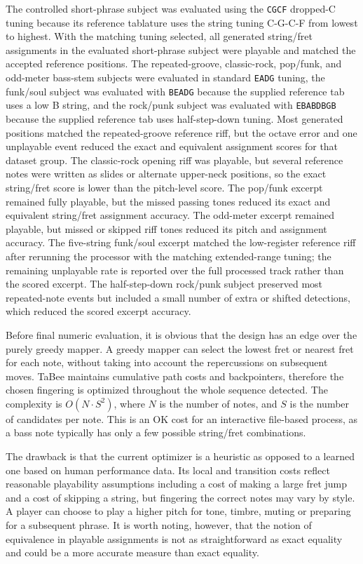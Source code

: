 \documentclass[a4paper, 12pt, titlepage]{article}
\begin{document}
The controlled short-phrase subject was evaluated using the \texttt{CGCF} dropped-C tuning because its reference tablature uses the string tuning C-G-C-F from lowest to highest. With the matching tuning selected, all generated string/fret assignments in the evaluated short-phrase subject were playable and matched the accepted reference positions. The repeated-groove, classic-rock, pop/funk, and odd-meter bass-stem subjects were evaluated in standard \texttt{EADG} tuning, the funk/soul subject was evaluated with \texttt{BEADG} because the supplied reference tab uses a low B string, and the rock/punk subject was evaluated with \texttt{EBABDBGB} because the supplied reference tab uses half-step-down tuning. Most generated positions matched the repeated-groove reference riff, but the octave error and one unplayable event reduced the exact and equivalent assignment scores for that dataset group. The classic-rock opening riff was playable, but several reference notes were written as slides or alternate upper-neck positions, so the exact string/fret score is lower than the pitch-level score. The pop/funk excerpt remained fully playable, but the missed passing tones reduced its exact and equivalent string/fret assignment accuracy. The odd-meter excerpt remained playable, but missed or skipped riff tones reduced its pitch and assignment accuracy. The five-string funk/soul excerpt matched the low-register reference riff after rerunning the processor with the matching extended-range tuning; the remaining unplayable rate is reported over the full processed track rather than the scored excerpt. The half-step-down rock/punk subject preserved most repeated-note events but included a small number of extra or shifted detections, which reduced the scored excerpt accuracy.

Before final numeric evaluation, it is obvious that the design has an edge over the purely greedy mapper. A greedy mapper can select the lowest fret or nearest fret for each note, without taking into account the repercussions on subsequent moves. TaBee maintains cumulative path costs and backpointers, therefore the chosen fingering is optimized throughout the whole sequence detected. The complexity is $O(N \cdot S^2)$, where $N$ is the number of notes, and $S$ is the number of candidates per note. This is an OK cost for an interactive file-based process, as a bass note typically has only a few possible string/fret combinations.

The drawback is that the current optimizer is a heuristic as opposed to a learned one based on human performance data. Its local and transition costs reflect reasonable playability assumptions including a cost of making a large fret jump and a cost of skipping a string, but fingering the correct notes may vary by style. A player can choose to play a higher pitch for tone, timbre, muting or preparing for a subsequent phrase. It is worth noting, however, that the notion of equivalence in playable assignments is not as straightforward as exact equality and could be a more accurate measure than exact equality.
\end{document}
